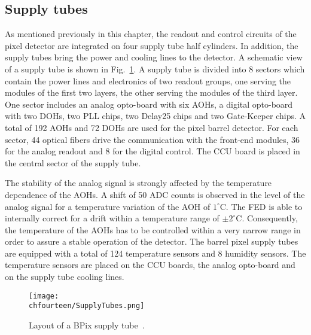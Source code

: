 \subsection{Supply tubes}

As mentioned previously in this chapter, the readout and control circuits of the pixel detector are integrated on four supply tube half cylinders.
In addition, the supply tubes bring the power and cooling lines to the detector.
A schematic view of a supply tube is shown in Fig.~\ref{fig:SupplyTubes}.
A supply tube is divided into 8 sectors which contain the power lines and electronics of two readout groups, one serving the modules of the first two layers, the other serving the modules of the third layer.
One sector includes an analog opto-board with six AOHs, a digital opto-board with two DOHs, two PLL chips, two Delay25 chips and two Gate-Keeper chips.
A total of 192 AOHs and 72 DOHs are used for the pixel barrel detector. For each sector, 44 optical fibers drive the communication with the front-end modules, 36 for the analog readout and 8 for the digital control. 
The CCU board is placed in the central sector of the supply tube.
  
 The stability of the analog signal is strongly affected by the temperature dependence of the AOHs.
A shift of 50 ADC counts is observed in the level of the analog signal for a temperature variation of the AOH of $1^\circ$\unit{C}.
The FED is able to internally correct for a drift within a temperature range of $\pm2^\circ$\unit{C}.
Consequently, the temperature of the AOHs has to be controlled within a very narrow range in order to assure a stable operation of the detector.
The barrel pixel supply tubes are equipped with a total of 124 temperature sensors and 8 humidity sensors.
The temperature sensors are placed on the CCU boards, the analog opto-board and on the supply tube cooling lines.

\begin{figure}[!htb]
 \begin{center}
 \texttt{[image: \\chfourteen/SupplyTubes.png]}
 \end{center}
 \caption{Layout of a BPix supply tube~\cite{Kastli2007724}.}
 \label{fig:SupplyTubes}
\end{figure}

